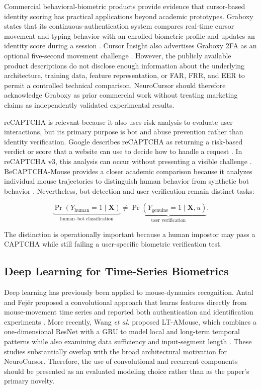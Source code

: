 \documentclass[conference]{IEEEtran}
\begin{document}
Commercial behavioral-biometric products provide evidence that cursor-based identity scoring has practical applications beyond academic prototypes. Graboxy states that its continuous-authentication system compares real-time cursor movement and typing behavior with an enrolled biometric profile and updates an identity score during a session \cite{graboxyContinuous}. Cursor Insight also advertises Graboxy 2FA as an optional five-second movement challenge \cite{graboxyChallenge}. However, the publicly available product descriptions do not disclose enough information about the underlying architecture, training data, feature representation, or FAR, FRR, and EER to permit a controlled technical comparison. NeuroCursor should therefore acknowledge Graboxy as prior commercial work without treating marketing claims as independently validated experimental results.

reCAPTCHA is relevant because it also uses risk analysis to evaluate user interactions, but its primary purpose is bot and abuse prevention rather than identity verification. Google describes reCAPTCHA as returning a risk-based verdict or score that a website can use to decide how to handle a request \cite{googleRecaptchaOverview}. In reCAPTCHA v3, this analysis can occur without presenting a visible challenge \cite{googleRecaptchaV3}. BeCAPTCHA-Mouse provides a closer academic comparison because it analyzes individual mouse trajectories to distinguish human behavior from synthetic bot behavior \cite{acien2020BeCAPTCHA}. Nevertheless, bot detection and user verification remain distinct tasks:

\begin{equation}
\underbrace{
\Pr(Y_{\mathrm{human}}=1 \mid \mathbf{X})
}_{\text{human--bot classification}}
\neq
\underbrace{
\Pr(Y_{\mathrm{genuine}}=1 \mid \mathbf{X},u)
}_{\text{user verification}}.
\label{eq:captcha_verification_distinction}
\end{equation}

The distinction is operationally important because a human impostor may pass a CAPTCHA while still failing a user-specific biometric verification test.

\subsection{Deep Learning for Time-Series Biometrics}

Deep learning has previously been applied to mouse-dynamics recognition. Antal and Fej\'er proposed a convolutional approach that learns features directly from mouse-movement time series and reported both authentication and identification experiments \cite{antalFejer2020}. More recently, Wang \textit{et al.} proposed LT-AMouse, which combines a one-dimensional ResNet with a GRU to model local and long-term temporal patterns while also examining data sufficiency and input-segment length \cite{wang2025Mouse}. These studies substantially overlap with the broad architectural motivation for NeuroCursor. Therefore, the use of convolutional and recurrent components should be presented as an evaluated modeling choice rather than as the paper's primary novelty.
\end{document}
